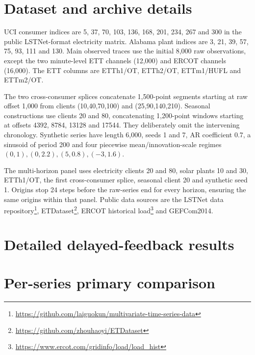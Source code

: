 
\section{Dataset and archive details}\label{app:data}
UCI consumer indices are 5, 37, 70, 103, 136, 168, 201, 234, 267 and 300 in the public
LSTNet-format electricity matrix. Alabama plant indices are 3, 21, 39, 57, 75, 93, 111
and 130. Main observed traces use the initial 8,000 raw observations, except the two
minute-level ETT channels (12,000) and ERCOT channels (16,000). The ETT columns are
ETTh1/OT, ETTh2/OT, ETTm1/HUFL and ETTm2/OT.

The two cross-consumer splices concatenate 1,500-point segments starting at raw offset
1,000 from clients (10,40,70,100) and (25,90,140,210). Seasonal constructions use clients
20 and 80, concatenating 1,200-point windows starting at offsets 4392, 8784, 13128 and
17544. They deliberately omit the intervening chronology. Synthetic series have length
6,000, seeds 1 and 7, AR coefficient 0.7, a sinusoid of period 200 and four piecewise
mean/innovation-scale regimes $(0,1),(0,2.2),(5,0.8),(-3,1.6)$.

The multi-horizon panel uses electricity clients 20 and 80, solar plants 10 and 30,
ETTh1/OT, the first cross-consumer splice, seasonal client 20 and synthetic seed 1.
Origins stop 24 steps before the raw-series end for every horizon, ensuring the same
origins within that panel. Public data sources are the LSTNet data repository\footnote{\url{https://github.com/laiguokun/multivariate-time-series-data}},
ETDataset\footnote{\url{https://github.com/zhouhaoyi/ETDataset}}, ERCOT historical
load\footnote{\url{https://www.ercot.com/gridinfo/load/load_hist}} and GEFCom2014.


\clearpage
\section{Detailed delayed-feedback results}
\begin{table}[h!]\centering\small
\caption{Multi-horizon comparison. Gains use the residual--ACI score at the same horizon.
Local error is in percentage points. Tuning never uses test labels.}
\label{tab:horizon}
\end{table}


\clearpage
\section{Per-series primary comparison}
\begin{table}[h!]\centering\small
\caption{Default CQR--ACI compared with default residual--ACI, averaged over four backbones.}

\end{table}


